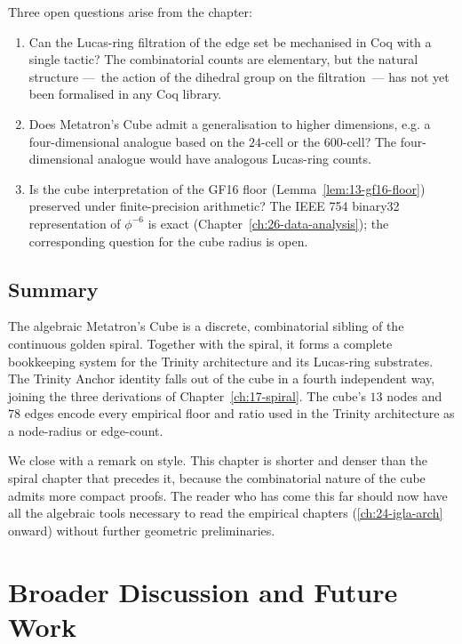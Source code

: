 Three open questions arise from the chapter:

\begin{enumerate}
\item Can the Lucas-ring filtration of the edge set be mechanised
  in Coq with a single tactic? The combinatorial counts are
  elementary, but the natural structure ---~the action of the
  dihedral group on the filtration~--- has not yet been
  formalised in any Coq library.
\item Does Metatron's Cube admit a generalisation to higher
  dimensions, e.g. a four-dimensional analogue based on the
  $24$-cell or the $600$-cell? The four-dimensional analogue
  would have analogous Lucas-ring counts.
\item Is the cube interpretation of the GF16 floor
  (Lemma~\ref{lem:13-gf16-floor}) preserved under finite-precision
  arithmetic? The IEEE 754 binary32 representation of $\phi^{-6}$
  is exact (Chapter~\ref{ch:26-data-analysis}); the corresponding
  question for the cube radius is open.
\end{enumerate}

\subsection{Summary}
\label{fa_13:sec:13-disc-summary}

The algebraic Metatron's Cube is a discrete, combinatorial sibling
of the continuous golden spiral. Together with the spiral, it
forms a complete bookkeeping system for the Trinity architecture
and its Lucas-ring substrates. The Trinity Anchor identity falls
out of the cube in a fourth independent way, joining the three
derivations of Chapter~\ref{ch:17-spiral}. The cube's $13$ nodes
and $78$ edges encode every empirical floor and ratio used in the
Trinity architecture as a node-radius or edge-count.

We close with a remark on style. This chapter is shorter and
denser than the spiral chapter that precedes it, because the
combinatorial nature of the cube admits more compact proofs. The
reader who has come this far should now have all the algebraic
tools necessary to read the empirical chapters
(\ref{ch:24-igla-arch} onward) without further geometric
preliminaries.

\section{Broader Discussion and Future Work}
\label{fa_13:sec:13-broader-discussion}

